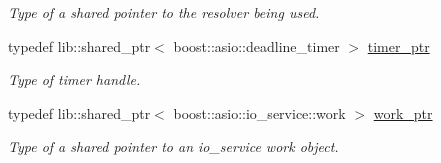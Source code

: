\begin{DoxyCompactItemize}
\begin{DoxyCompactList}\small\item\em Type of a shared pointer to the resolver being used. \end{DoxyCompactList}\item 
typedef lib\+::shared\+\_\+ptr$<$ boost\+::asio\+::deadline\+\_\+timer $>$ \hyperlink{classwebsocketpp_1_1transport_1_1asio_1_1endpoint_a29e73e24476c2b3cef35963613653450}{timer\+\_\+ptr}\hypertarget{classwebsocketpp_1_1transport_1_1asio_1_1endpoint_a29e73e24476c2b3cef35963613653450}{}\label{classwebsocketpp_1_1transport_1_1asio_1_1endpoint_a29e73e24476c2b3cef35963613653450}

\begin{DoxyCompactList}\small\item\em Type of timer handle. \end{DoxyCompactList}\item 
typedef lib\+::shared\+\_\+ptr$<$ boost\+::asio\+::io\+\_\+service\+::work $>$ \hyperlink{classwebsocketpp_1_1transport_1_1asio_1_1endpoint_adfcf23c6cbac3eff0000a0bb69235f5f}{work\+\_\+ptr}\hypertarget{classwebsocketpp_1_1transport_1_1asio_1_1endpoint_adfcf23c6cbac3eff0000a0bb69235f5f}{}\label{classwebsocketpp_1_1transport_1_1asio_1_1endpoint_adfcf23c6cbac3eff0000a0bb69235f5f}

\begin{DoxyCompactList}\small\item\em Type of a shared pointer to an io\+\_\+service work object. \end{DoxyCompactList}\end{DoxyCompactItemize}
